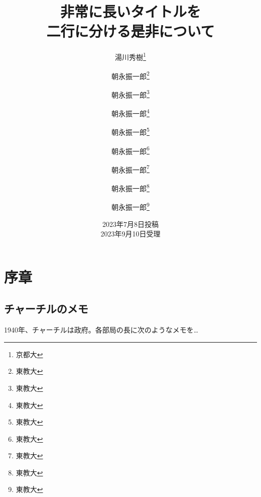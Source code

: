 \documentclass[titlepage]{jlreq}
\begin{document}
\title{非常に長いタイトルを \\ 二行に分ける是非について}
\author{湯川秀樹\thanks{京都大} \and 朝永振一郎\thanks{東教大} 
\and 朝永振一郎\thanks{東教大} \and 朝永振一郎\thanks{東教大} 
\and 朝永振一郎\thanks{東教大} \and 朝永振一郎\thanks{東教大} 
\and 朝永振一郎\thanks{東教大} \and 朝永振一郎\thanks{東教大} 
\and 朝永振一郎\thanks{東教大} %
}
\date{2023年7月8日投稿 \\ 2023年9月10日受理}
\maketitle

\section{序章}
\subsection{チャーチルのメモ}
 1940年、チャーチルは政府。各部局の長に次のようなメモを…
\end{document}
